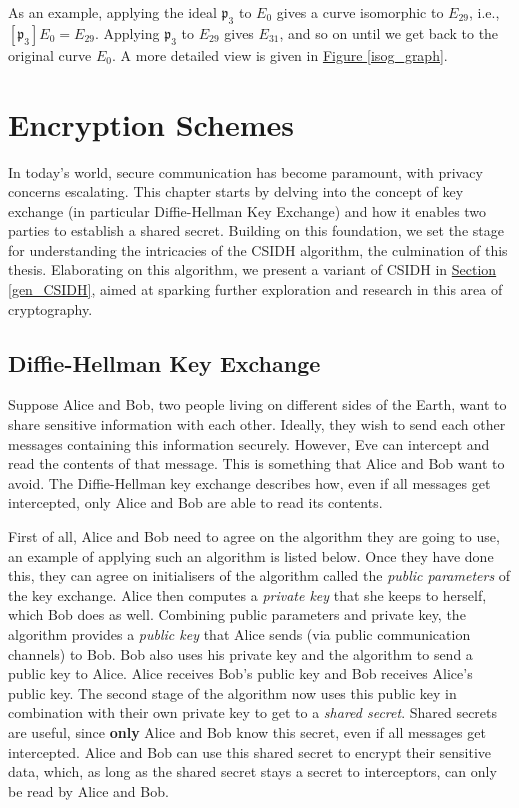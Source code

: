 \documentclass[openany, a4paper, 10pt]{book}
\theoremstyle{plain}
\theoremstyle{plain}
\theoremstyle{plain}
\theoremstyle{definition}
\theoremstyle{plain}
\theoremstyle{definition}
\theoremstyle{remark}
\newcommand{\figref}[1]{\hyperref[#1]{Figure \ref{#1}}}
\newcommand{\secref}[1]{\hyperref[#1]{Section \ref{#1}}}
\begin{document}
As an example, applying the ideal $\mathfrak p_3$ to $E_0$ gives a curve isomorphic to $E_{29}$, i.e., $[\mathfrak p_3]E_0 = E_{29}$.
Applying $\mathfrak p_3$ to $E_{29}$ gives $E_{31}$, and so on until we get back to the original curve $E_0$. A more detailed view is given in \figref{isog_graph}.

\chapter{Encryption Schemes}
In today's world, secure communication has become paramount, with privacy concerns escalating.
This chapter starts by delving into the concept of key exchange (in particular Diffie-Hellman Key Exchange) and how it enables two parties to establish a shared secret.
Building on this foundation, we set the stage for understanding the intricacies of the CSIDH algorithm, the culmination of this thesis.
Elaborating on this algorithm, we present a variant of CSIDH in \secref{gen_CSIDH}, aimed at sparking further exploration and research in this area of cryptography.

\section{Diffie-Hellman Key Exchange}\label{sec:diffie_hellman}
Suppose Alice and Bob, two people living on different sides of the Earth, want to share sensitive information with each other.
Ideally, they wish to send each other messages containing this information securely.
However, Eve can intercept and read the contents of that message.
This is something that Alice and Bob want to avoid.
The Diffie-Hellman key exchange describes how, even if all messages get intercepted, only Alice and Bob are able to read its contents.

First of all, Alice and Bob need to agree on the algorithm they are going to use, an example of applying such an algorithm is listed below.
Once they have done this, they can agree on initialisers of the algorithm called the \textit{public parameters} of the key exchange.
Alice then computes a \textit{private key} that she keeps to herself, which Bob does as well.
Combining public parameters and private key, the algorithm provides a \textit{public key} that Alice sends (via public communication channels) to Bob.
Bob also uses his private key and the algorithm to send a public key to Alice.
Alice receives Bob's public key and Bob receives Alice's public key.
The second stage of the algorithm now uses this public key in combination with their own private key to get to a \textit{shared secret}.
Shared secrets are useful, since \textbf{only} Alice and Bob know this secret, even if all messages get intercepted.
Alice and Bob can use this shared secret to encrypt their sensitive data, which, as long as the shared secret stays a secret to interceptors, can only be read by Alice and Bob.
\end{document}
